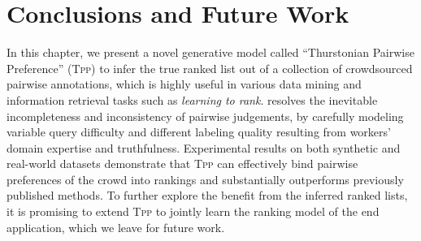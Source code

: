\section{Conclusions and Future Work} \label{sec::tpp_conclude}

In this chapter, we present a novel generative model called ``Thurstonian
Pairwise Preference'' (\textsc{Tpp}) to infer the true ranked list out of a
collection of crowdsourced pairwise annotations, which is highly useful in
various data mining and information retrieval tasks such as \emph{learning to
rank}. \tpp{} resolves the inevitable incompleteness and inconsistency of
pairwise judgements, by carefully modeling variable query difficulty and
different labeling quality resulting from workers' domain expertise and
truthfulness. Experimental results on both synthetic and real-world datasets
demonstrate that \textsc{Tpp} can effectively bind pairwise preferences of the
crowd into rankings and substantially outperforms previously published methods.
To further explore the benefit from the inferred ranked lists,  it is promising
to extend  \textsc{Tpp} to jointly learn the ranking model of the end
application, which we leave for future work.



